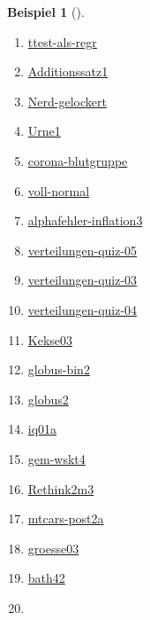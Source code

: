 \documentclass[
  ngerman,
  letterpaper,
  twoside,
  open=any]{scrbook}
\providecommand{\tightlist}{%
  \setlength{\itemsep}{0pt}\setlength{\parskip}{0pt}}\usepackage{longtable,booktabs,array}
\theoremstyle{definition}
\newtheorem{example}{Beispiel}[chapter]
\theoremstyle{plain}
\theoremstyle{definition}
\theoremstyle{definition}
\theoremstyle{remark}
\begin{document}
\begin{example}[]
\begin{enumerate}
\def\labelenumi{\arabic{enumi}.}
\tightlist
\item
  \href{https://datenwerk.netlify.app/posts/ttest-als-regr/ttest-als-regr/}{ttest-als-regr}
\item
  \href{https://datenwerk.netlify.app/posts/additionssatz1/additionssatz1}{Additionssatz1}
\item
  \href{https://datenwerk.netlify.app/posts/nerd-gelockert/nerd-gelockert}{Nerd-gelockert}
\item
  \href{https://datenwerk.netlify.app/posts/urne1/urne1}{Urne1}
\item
  \href{https://datenwerk.netlify.app/posts/corona-blutgruppe/corona-blutgruppe.html}{corona-blutgruppe}
\item
  \href{https://datenwerk.netlify.app/posts/voll-normal/voll-normal.html}{voll-normal}
\item
  \href{https://datenwerk.netlify.app/posts/alphafehler-inflation3/alphafehler-inflation3.html}{alphafehler-inflation3}
\item
  \href{https://datenwerk.netlify.app/posts/verteilungen-quiz-05/verteilungen-quiz-05}{verteilungen-quiz-05}
\item
  \href{https://datenwerk.netlify.app/posts/verteilungen-quiz-03/verteilungen-quiz-03}{verteilungen-quiz-03}
\item
  \href{https://datenwerk.netlify.app/posts/verteilungen-quiz-04/verteilungen-quiz-04}{verteilungen-quiz-04}
\item
  \href{https://datenwerk.netlify.app/posts/kekse03/index.html}{Kekse03}
\item
  \href{https://datenwerk.netlify.app/posts/globus-bin2/}{globus-bin2}
\item
  \href{https://datenwerk.netlify.app/posts/globus2/}{globus2}
\item
  \href{https://datenwerk.netlify.app/posts/iq01a/}{iq01a}
\item
  \href{https://datenwerk.netlify.app/posts/gem-wskt4/}{gem-wskt4}
\item
  \href{https://datenwerk.netlify.app/posts/rethink2m3/rethink2m3}{Rethink2m3}
\item
  \href{https://datenwerk.netlify.app/posts/mtcars-post2a/}{mtcars-post2a}
\item
  \href{https://datenwerk.netlify.app/posts/groesse03/}{groesse03}
\item
  \href{https://datenwerk.netlify.app/posts/bath42/bath42.html}{bath42}
\item

\end{enumerate}
\end{example}
\end{document}
